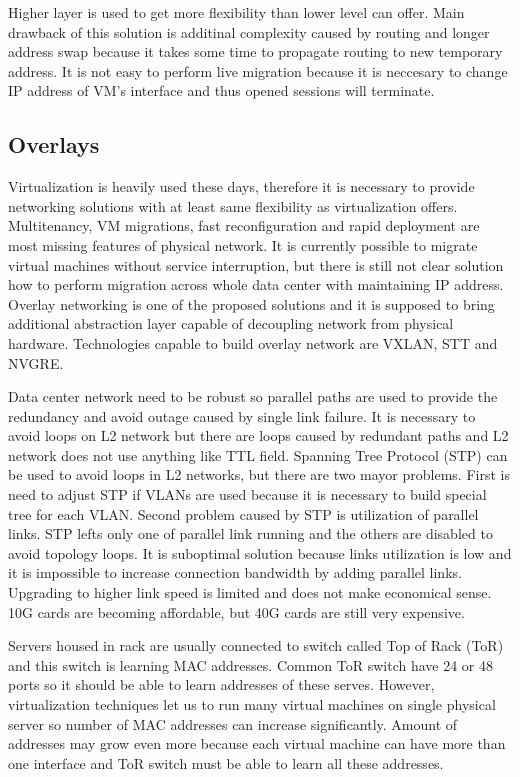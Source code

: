 Higher layer is used to get more flexibility than lower level can offer. Main drawback of this solution is additinal complexity caused by routing and longer address swap because it takes some time to propagate routing to new temporary address. It is not easy to perform live migration because it is neccesary to change \Ac{IP} address of \Ac{VM}'s interface and thus opened sessions will terminate.

\subsection{Overlays}
\label{par:overlays}
Virtualization is heavily used these days, therefore it is necessary to provide networking solutions with at least same flexibility as virtualization offers. Multitenancy, \Ac{VM} migrations, fast reconfiguration and rapid deployment are most missing features of physical network. It is currently possible to migrate virtual machines without service interruption, but there is still not clear solution how to perform migration across whole data center with maintaining \Ac{IP} address. Overlay networking is one of the proposed solutions and it is supposed to bring additional abstraction layer capable of decoupling network from physical hardware. 
Technologies capable to build overlay network are \Ac{VXLAN}, \Ac{STT} and \Ac{NVGRE}. 

Data center network need to be robust so parallel paths are used to provide the redundancy and avoid outage caused by single link failure. It is necessary to avoid loops on L2 network but there are loops caused by redundant paths and L2 network does not use anything like \Ac{TTL} field.  Spanning Tree Protocol (\Ac{STP}) can be used to avoid loops in L2 networks, but there are two mayor problems. First is need to adjust \Ac{STP} if \Ac{VLAN}s are used because it is necessary to build special tree for each \Ac{VLAN}. Second problem caused by \Ac{STP} is utilization of parallel links. \Ac{STP} lefts only one of parallel link running and the others are disabled to avoid topology loops. It is suboptimal solution because links utilization is low and it is impossible to increase connection bandwidth by adding parallel links. Upgrading to higher link speed is limited and does not make economical sense. 10G cards are becoming affordable, but 40G cards are still very expensive.

Servers housed in rack are usually connected to switch called Top of Rack (\Ac{ToR}) and this switch is learning \Ac{MAC} addresses. Common \Ac{ToR} switch have 24 or 48 ports so it should be able to learn addresses of these serves. However, virtualization techniques let us to run many virtual machines on single physical server so number of \Ac{MAC} addresses can increase significantly. Amount of addresses may grow even more because each virtual machine can have more than one interface and \Ac{ToR} switch must be able to learn all these addresses.

